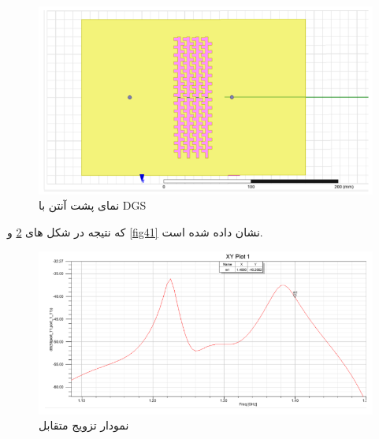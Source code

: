 \begin{figure}
	\centering
	\includegraphics[scale=0.5]{Images/fig39.png}
	\caption{نمای پشت آنتن با DGS}
	\label{fig39}
\end{figure}

که نتیجه در شکل های 
\ref{fig40}
و
\ref{fig41}
نشان داده شده است.

\begin{figure}
	\centering
	\includegraphics[scale=0.5]{Images/fig40.png}
	\caption{نمودار تزویج متقابل}
	\label{fig40}
\end{figure}


